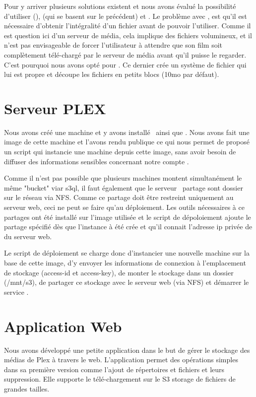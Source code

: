 \documentclass[french]{msereport}
\newcommand{\aws}{\brand{Amazon Web Services}}
\newcommand{\plex}{\brand{PLEX}}
\begin{document}
		Pour y arriver plusieurs solutions existent et nous avons évalué la possibilité d'utiliser  (),  (qui se basent sur le précédent) et . Le problème avec , est qu’il est nécessaire d’obtenir l’intégralité d’un fichier avant de pouvoir l’utiliser. Comme il est question ici d’un serveur de média, cela implique des fichiers volumineux, et il n’est pas envisageable de forcer l’utilisateur à attendre que son film soit complètement télé-chargé par le serveur de média avant qu’il puisse le regarder. C’est pourquoi nous avons opté pour . Ce dernier crée un système de fichier qui lui est propre et découpe les fichiers en petits blocs (10mo par défaut).
	
	\section{Serveur PLEX}		
		Nous avons créé une machine et y avons installé \plex\ ainsi que . Nous avons fait une image de cette machine et l’avons rendu publique ce qui nous permet de proposé un script qui instancie une machine depuis cette image, sans avoir besoin de diffuser des informations sensibles concernant notre compte \aws.
		
		Comme il n'est pas possible que plusieurs machines montent simultanément le même "bucket" viar s3ql, il faut également que le serveur \plex\ partage sont dossier sur le réseau via NFS. Comme ce partage doit être restreint uniquement au serveur web, ceci ne peut se faire qu'au déploiement. Les outils nécessaires à ce partages ont été installé sur l'image utilisée et le script de dépoloiement ajoute le partage spécifié dès que l'instance à été crée et qu'il connait l'adresse ip privée de du serveur web.
		
		Le script de déploiement se charge donc d’instancier une nouvelle machine sur la base de cette image, d’y envoyer les informations de connexion à l’emplacement de stockage (access-id et access-key), de monter le stockage dans un dossier (/mnt/s3), de partager ce stockage avec le serveur web (via NFS) et démarrer le service \plex.
	
	\section{Application Web}
		Nous avons développé une petite application dans le but de gérer le stockage des médias de Plex à travers le web. L’application permet des opérations simples dans sa première version comme l’ajout de répertoires et fichiers et leurs suppression. Elle supporte le télé-chargement sur le S3 storage de fichiers de grandes tailles.
		
\end{document}
